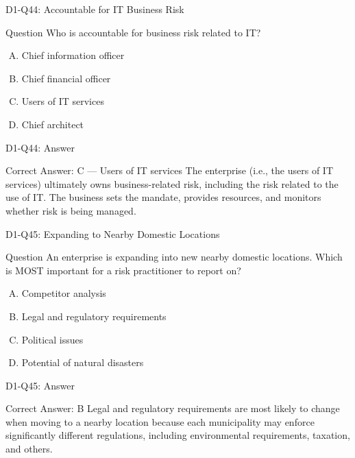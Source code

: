 \documentclass{beamer}
\begin{document}
	\begin{frame}{D1-Q44: Accountable for IT Business Risk}
		\begin{block}{Question}
			Who is accountable for business risk related to IT?
		\end{block}
		\begin{enumerate}[(A)]
			\item Chief information officer
			\item Chief financial officer
			\item Users of IT services
			\item Chief architect
		\end{enumerate}
	\end{frame}
	\begin{frame}{D1-Q44: Answer}
		\begin{block}{Correct Answer: C --- Users of IT services}
			The enterprise (i.e., the users of IT services) ultimately owns business-related risk, including the risk related to the use of IT. The business sets the mandate, provides resources, and monitors whether risk is being managed.
		\end{block}
	\end{frame}
	
	\begin{frame}{D1-Q45: Expanding to Nearby Domestic Locations}
		\begin{block}{Question}
			An enterprise is expanding into new nearby domestic locations. Which is MOST important for a risk practitioner to report on?
		\end{block}
		\begin{enumerate}[(A)]
			\item Competitor analysis
			\item Legal and regulatory requirements
			\item Political issues
			\item Potential of natural disasters
		\end{enumerate}
	\end{frame}
	\begin{frame}{D1-Q45: Answer}
		\begin{block}{Correct Answer: B}
			Legal and regulatory requirements are most likely to change when moving to a nearby location because each municipality may enforce significantly different regulations, including environmental requirements, taxation, and others.
		\end{block}
	\end{frame}
	
\end{document}
